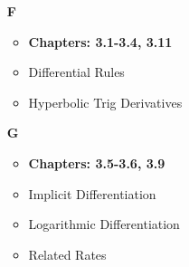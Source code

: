 \documentclass{letter}
\begin{document}
\begin{minipage}[t]{0.5\textwidth}
\begin{itemize}
\begin{itemize}
			\end{itemize}
			\item[\large \textbf{F}]
			\begin{itemize}
				\item \textbf{Chapters: 3.1-3.4, 3.11}
				\item Differential Rules
				\item Hyperbolic Trig Derivatives\\
			\end{itemize}
			\item[\large \textbf{G}]
			\begin{itemize}
				\item \textbf{Chapters: 3.5-3.6, 3.9}
				\item Implicit Differentiation
				\item Logarithmic Differentiation
				\item Related Rates\\
			\end{itemize}
		\end{itemize}
	\end{minipage}
\end{document}
